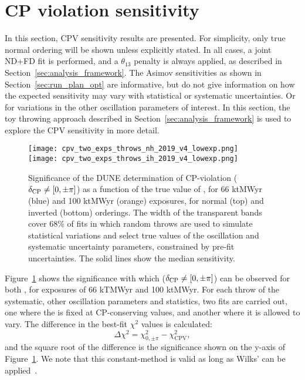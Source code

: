 \FloatBarrier
\section{CP violation sensitivity}
\label{sec:cp_sens}

In this section, CPV sensitivity results are presented. For simplicity, only true normal ordering will be shown unless explicitly stated. In all cases, a joint ND+FD fit is performed, and a $\theta_{13}$ penalty is always applied, as described in Section~\ref{sec:analysis_framework}. The Asimov sensitivities as shown in Section~\ref{sec:run_plan_opt} are informative, but do not give information on how the expected sensitivity may vary with statistical or systematic uncertainties. Or for variations in the other oscillation parameters of interest. In this section, the toy throwing approach described in Section~\ref{sec:analysis_framework} is used to explore the CPV sensitivity in more detail.

\begin{figure}[htbp]
  \centering
  \texttt{[image: cpv\_two\_exps\_throws\_nh\_2019\_v4\_lowexp.png]}\\
  \texttt{[image: cpv\_two\_exps\_throws\_ih\_2019\_v4\_lowexp.png]}
  \caption{Significance of the DUNE determination of CP-violation ($\delta_{\rm CP} \neq [0,\pm\pi]$) as a function of the true value of \deltacp, for 66 ktMWyr (blue) and 100 ktMWyr (orange) exposures, for normal (top) and inverted (bottom) orderings. The width of the transparent bands cover 68\% of fits in which random throws are used to simulate statistical variations and select true values of the oscillation and systematic uncertainty parameters, constrained by pre-fit uncertainties. The solid lines show the median sensitivity.}
  \label{fig:cpv_bands}
\end{figure}
Figure~\ref{fig:cpv_bands} shows the significance with which  ($\delta_{\rm CP} \neq [0, \pm\pi]$) can be observed for both  , for exposures of 66 kTMWyr and 100 ktMWyr. For each throw of the systematic, other oscillation parameters and statistics, two fits are carried out, one where the \deltacp is fixed at CP-conserving values, and another where it is allowed to vary. The difference in the best-fit $\chi^{2}$ values is calculated:
\begin{equation}
  \Delta\chi^{2} = \chi^{2}_{0,\pm\pi} - \chi^{2}_{\mathrm{CPV}},
  \label{eq:cpv_chi2}
\end{equation}
\noindent and the square root of the difference is the significance shown on the y-axis of Figure~\ref{fig:cpv_bands}. We note that this constant-\dchisq method is valid as long as Wilks' can be applied~\cite{wilks}.

